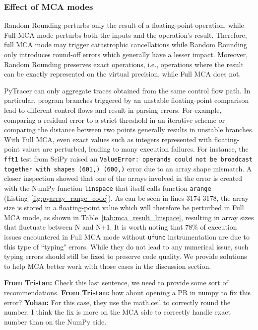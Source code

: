 \documentclass[11pt]{article}
\newcommand{\tristan}[1]{\color{orange}\textbf{From Tristan:} #1\color{black}\xspace}
\newcommand{\Yohan}[1]{\color{green!75!black}\textbf{Yohan:} #1\color{black}\xspace}
\newcommand{\pytracer}[0]{PyTracer\xspace}
\begin{document}
\subsubsection{Effect of MCA modes}
\label{sec:impact_mca_modes}
Random Rounding perturbs only the result of a floating-point operation, while Full MCA mode perturbs both the inputs and the operation's result. 
Therefore, full MCA mode may trigger catastrophic cancellations while Random Rounding only introduces round-off errors which generally have a lesser impact.
Moreover, Random Rounding preserves exact operations, i.e., operations where the result can be exactly represented on the virtual precision, while Full MCA does not.

\pytracer can only aggregate traces obtained from the same control flow path. In particular, program branches triggered by an unstable floating-point comparison lead to different control flows and result in parsing errors. 
For example, comparing a residual error to a strict threshold in an iterative scheme or comparing the distance between two points generally results in unstable branches. 
With Full MCA, even exact values such as integers represented with floating-point values are perturbed, leading to many execution failures. For instance,  the \texttt{fft1} test from SciPy raised an \texttt{ValueError: operands could not be broadcast together with shapes (601,) (600,)} error due to an array shape mismatch. A closer inspection showed that one of the arrays involved in the error is created with the NumPy function \texttt{linspace} that itself calls function \texttt{arange} (Listing~\ref{fig:pyarray_range_code}). As can be seen in lines  3174-3178, the array size is stored in a floating-point value which will therefore be perturbed in Full MCA mode, as shown in Table~\ref{tab:mca_result_linspace}, resulting in array sizes that fluctuate
between N and N+1. 
It is worth noting that 78\% of execution issues encountered in Full MCA mode without \texttt{ufunc} instrumentation
are due to this type of ``typing" errors. While they do not lead to any numerical issue, such typing errors should still be fixed to preserve code quality. We provide solutions to help MCA better work with those cases in the discussion section.

\tristan{Check this last sentence, we need to provide some sort of recommendations}. \tristan{how about opening a PR in numpy to fix this error?}
\Yohan{For this case, they use the math.ceil to correctly round the number, I think the fix is more on the MCA side to
correctly handle exact number than on the NumPy side.}
\end{document}
